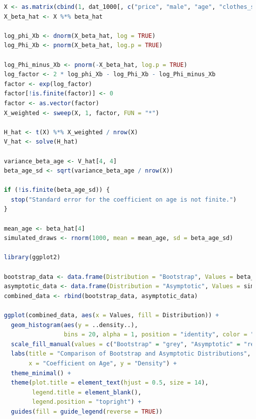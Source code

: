 \documentclass[a4paper,12pt]{article} %
\theoremstyle{nonitalic}
\newenvironment{solution}[1]
  {\renewcommand\theinnercustomsol{#1}\innercustomsol}
  {\endinnercustomsol}
\newcounter{solutionctr}[section]
\renewcommand{\thesolutionctr}{(\alph{solutionctr})}
\newenvironment{autosolution}
  {\stepcounter{solutionctr}\begin{solution}{\thesolutionctr}}
  {\end{solution}}
\begin{document}
\begin{autosolution}
    \begin{lstlisting}[language=R]
X <- as.matrix(cbind(1, dat_1000[, c("price", "male", "age", "clothes_shoes", "cosmetics", "food", "technology")]))
X_beta_hat <- X %*% beta_hat

log_phi_Xb <- dnorm(X_beta_hat, log = TRUE)
log_Phi_Xb <- pnorm(X_beta_hat, log.p = TRUE)

log_Phi_minus_Xb <- pnorm(-X_beta_hat, log.p = TRUE)
log_factor <- 2 * log_phi_Xb - log_Phi_Xb - log_Phi_minus_Xb
factor <- exp(log_factor)
factor[!is.finite(factor)] <- 0
factor <- as.vector(factor)
X_weighted <- sweep(X, 1, factor, FUN = "*")

H_hat <- t(X) %*% X_weighted / nrow(X)
V_hat <- solve(H_hat)

variance_beta_age <- V_hat[4, 4]
beta_age_sd <- sqrt(variance_beta_age / nrow(X))

if (!is.finite(beta_age_sd)) {
  stop("Standard error for the coefficient on age is not finite.")
}

mean_age <- beta_hat[4]
simulated_draws <- rnorm(1000, mean = mean_age, sd = beta_age_sd)

library(ggplot2)

bootstrap_data <- data.frame(Distribution = "Bootstrap", Values = beta_age_bootstrap)
asymptotic_data <- data.frame(Distribution = "Asymptotic", Values = simulated_draws)
combined_data <- rbind(bootstrap_data, asymptotic_data)

ggplot(combined_data, aes(x = Values, fill = Distribution)) +
  geom_histogram(aes(y = ..density..), 
                 bins = 20, alpha = 1, position = "identity", color = "black") +
  scale_fill_manual(values = c("Bootstrap" = "grey", "Asymptotic" = "red")) +
  labs(title = "Comparison of Bootstrap and Asymptotic Distributions",
       x = "Coefficient on Age", y = "Density") +
  theme_minimal() +
  theme(plot.title = element_text(hjust = 0.5, size = 14),
        legend.title = element_blank(),
        legend.position = "topright") +
  guides(fill = guide_legend(reverse = TRUE)) 
    \end{lstlisting}
\end{autosolution}
\end{document}
